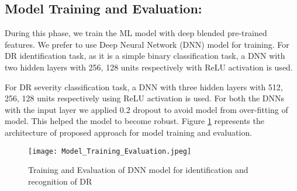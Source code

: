 \documentclass[electronics,article,accept ,moreauthors,pdftex]{mdpi}
\begin{document}
\subsection{Model Training and Evaluation:}
During this phase, we train the ML model with deep blended pre-trained features. We prefer to use Deep Neural Network (DNN) model for training. For DR identification task, as it is a simple binary classification task, a DNN with two hidden layers with 256, 128 units respectively with ReLU activation is used. 

For DR severity classification task, a DNN with three hidden layers with 512, 256, 128  units respectively using ReLU activation is used. 
For both the DNNs with the input layer we applied 0.2 dropout to avoid model from over-fitting of model. This helped the model to become robust.  Figure \ref{fig:model} represents the architecture of proposed approach for model training and evaluation. 
\begin{figure}[H]
    \center
    \texttt{[image: Model\_Training\_Evaluation.jpeg]}
    \caption{Training and Evaluation of DNN model for identification and recognition of DR}
    \label{fig:model}
\end{figure}
\end{document}
